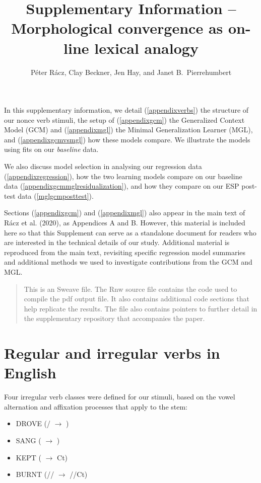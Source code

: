 \documentclass[12pt]{article}
\title{Supplementary Information -- Morphological convergence as on-line lexical analogy}
\author{P\'eter R\'acz, Clay Beckner, Jen Hay, and Janet B.\ Pierrehumbert}
\begin{document}



\maketitle

\noindent In this supplementary information, we detail (\ref{appendixverbs}) the structure of our nonce verb stimuli, the setup of (\ref{appendixgcm}) the Generalized Context Model (GCM) and (\ref{appendixmgl}) the Minimal Generalization Learner (MGL), and (\ref{appendixgcmvsmgl}) how these models compare. We illustrate the models using fits on our \emph {baseline} data. 

We also discuss model selection in analysing our regression data (\ref{appendixregression}), how the two learning models compare on our baseline data (\ref{appendixgcmmglresidualization}), and how they compare on our ESP post-test data (\ref{mglgcmposttest}). 

Sections (\ref{appendixgcm}) and (\ref{appendixmgl}) also appear in the main text of  R\'acz et al. (2020), as Appendices A and B. However, this material is included here so that this Supplement can serve as a standalone document for readers who are interested in the technical details of our study. Additional material is reproduced from the main text, revisiting specific regression model summaries and additional methods we used to investigate contributions from the GCM and MGL.

\begin{quote}
This is an Sweave file. The Rnw source file contains the code used to compile the pdf output file. It also contains additional code sections that help replicate the results. The file also contains pointers to further detail in the supplementary repository that accompanies the paper. 
\end{quote}

\section{Regular and irregular verbs in English \label{appendixverbs}}

Four irregular verb classes were defined for our stimuli, based on the vowel alternation and affixation processes that apply to the stem:

\begin{itemize}
    \item DROVE (\textipa{[aI]}/\textipa{[i]} $\rightarrow{}$ \textipa{[oU]})
    \item SANG (\textipa{[I]} $\rightarrow{}$ \textipa{[\ae]})
    \item KEPT (\textipa{[i]} $\rightarrow{}$ \textipa{[E]}Ct)
    \item BURNT (\textipa{[3]}/\textipa{[E]}/\textipa{[I]} $\rightarrow{}$ \textipa{[3]}/\textipa{[E]}/\textipa{[I]}Ct)
\end{itemize}
\end{document}
